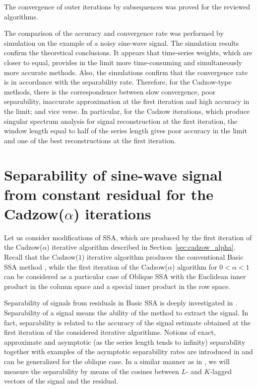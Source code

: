 \documentclass[sii]{ipart}
\begin{document}
The convergence of outer iterations by subsequences was proved for the reviewed algorithms.

The comparison of the accuracy and convergence rate was performed by simulation on the example of a noisy sine-wave signal. The simulation results confirm the theoretical conclusions. It appears that time-series weights, which are closer to equal, provides in the limit more time-consuming and simultaneously more accurate methods.
Also, the simulations confirm that the convergence rate is in accordance with the separability rate. Therefore, for the Cadzow-type methods,
there is the correspondence between slow convergence, poor separability,
inaccurate approximation at the first iteration and high accuracy in the limit; and vice verse.
In particular, for the Cadzow iterations, which produce singular spectrum analysis for signal reconstruction at the first iteration, the window length equal to half of the series length gives poor accuracy in the limit and
one of the best reconstructions at the first iteration.


\appendix

\section{Separability of sine-wave signal from constant residual for the Cadzow($\alpha$) iterations}
\label{sec:app}

Let us consider modifications of SSA, which are produced by the first iteration of the Cadzow($\alpha$) iterative algorithm described in Section~\ref{sec:cadzow_alpha}. Recall that the Cadzow($1$) iterative algorithm produces the conventional Basic SSA method \cite{Golyandina.etal2001,Golyandina.Zhigljavsky2012}, while the first iteration of the Cadzow($\alpha$) algorithm for $0<\alpha<1$ can be considered as a
particular case of Oblique SSA \cite{Golyandina2013} with the Euclidean inner product in the column space and a special inner product in the row space.

Separability of signals from residuals in Basic SSA is deeply investigated in \cite{Golyandina.etal2001,Golyandina2010}. Separability of a signal means the ability of the method to extract the signal. In fact, separability is related to the accuracy of the signal estimate obtained at the first iteration
of the considered iterative algorithms. Notions of exact, approximate and asymptotic (as the series length tends to infinity) separability together with examples of the asymptotic separability rates are introduced in \cite[Sections 1.5 and 6.1]{Golyandina.etal2001} and can be generalized for the oblique case. In a similar manner as in  \cite{Golyandina.etal2001}, we will measure the separability by means of the cosines between $L$- and $K$-lagged vectors
of the signal and the residual.
\end{document}
